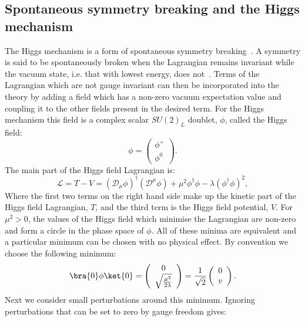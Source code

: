 \subsection{Spontaneous symmetry breaking and the Higgs mechanism}
\label{sec:ssb}
The Higgs mechanism is a form of spontaneous symmetry breaking~\cite{Englert:1964et,Higgs:1964ia,Higgs:1964pj,Guralnik:1964eu,Higgs:1966ev,Kibble:1967sv}. A symmetry is said to be spontaneously broken when the Lagrangian remains invariant while the vacuum state, i.e. that with lowest energy, does not~\cite{griffiths2008introduction}. Terms of the Lagrangian which are not gauge invariant can then be incorporated into the theory by adding a field which has a non-zero vacuum expectation value and coupling it to the other fields present in the desired term. For the Higgs mechanism this field is a complex scalar $SU\left(2\right)_{L}$ doublet, $\phi$, called the Higgs field:
\begin{equation}
\phi=\left(\begin{array}{c}\phi^+ \\ \phi^0 \end{array}\right).
\end{equation}
The main part of the Higgs field Lagrangian is:
\begin{equation}
  \label{eq:higlag}
\mathcal{L}=T-V=\left(\mathcal{D}_{\mu}\phi\right)^{\dag}\left(\mathcal{D}^{\mu}\phi\right)+\mu^{2}\phi^{\dag}\phi-\lambda\left(\phi^{\dag}\phi\right)^{2},
\end{equation}
Where the first two terms on the right hand side make up the kinetic part of the Higgs field Lagrangian, $T$, and the third term is the Higgs field potential, $V$. For $\mu^{2}>0$, the values of the Higgs field which minimise the Lagrangian are  non-zero and form a circle in the phase space of $\phi$. All of these minima are equivalent and a particular minimum can be chosen with no physical effect. By convention we choose the following minimum:
\begin{equation}
  \bra{0}\phi\ket{0}=\left(\begin{array}{c} 0 \\ \sqrt{\frac{\mu^{2}}{2\lambda}} \end{array}\right)=\frac{1}{\sqrt{2}}\left(\begin{array}{c} 0 \\ v \end{array}\right).
\end{equation}
Next we consider small perturbations around this minimum. Ignoring perturbations that can be set to zero by gauge freedom gives:
